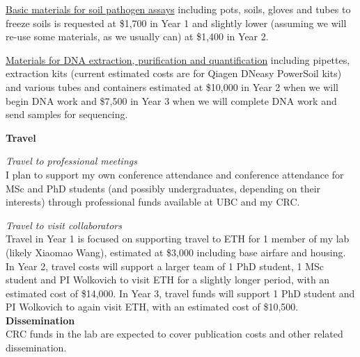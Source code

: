 \documentclass[12pt,oneside]{article}
\begin{document}
\underline{Basic materials for soil pathogen assays} including pots, soils, gloves and tubes to freeze soils is requested at \$1,700 in Year 1 and slightly lower (assuming we will re-use some materials, as we usually can) at \$1,400 in Year 2. 

\underline{Materials for DNA extraction, purification and quantification} including pipettes, extraction kits (current estimated costs are for Qiagen DNeasy PowerSoil kits) and various tubes and containers estimated at \$10,000 in Year 2 when we will begin DNA work and \$7,500 in Year 3 when we will complete DNA work and send samples for sequencing. 

{\bf Travel}

\emph{Travel to professional meetings}\\
I plan to support my own conference attendance and conference attendance for MSc and PhD students (and possibly undergraduates, depending on their interests) through professional funds available at UBC and my CRC. %

\emph{Travel to visit collaborators}\\
Travel in Year 1 is focused on supporting travel to ETH for 1 member of my lab (likely Xiaomao Wang), estimated at \$3,000 including base airfare and housing. In Year 2, travel costs will support a larger team of 1 PhD student, 1 MSc student and PI Wolkovich to visit ETH for a slightly longer period, with an estimated cost of \$14,000. In Year 3,  travel funds will support 1 PhD student and PI Wolkovich to again visit ETH, with an estimated cost of \$10,500. \\

{\bf Dissemination}\\ 
CRC funds in the lab are expected to cover publication costs and other related dissemination. \\
\end{document}
